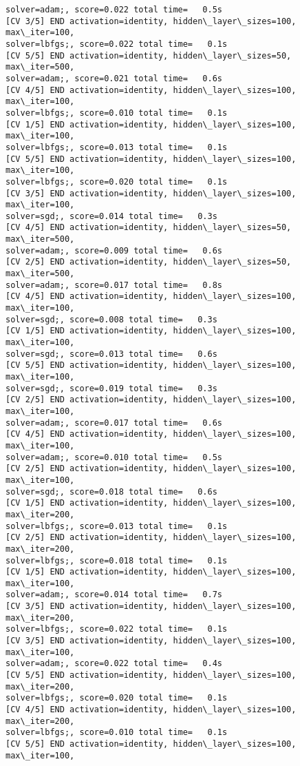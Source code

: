 \documentclass[11pt]{article}
\begin{document}
\begin{Verbatim}[commandchars=\\\{\}]
solver=adam;, score=0.022 total time=   0.5s
[CV 3/5] END activation=identity, hidden\_layer\_sizes=100, max\_iter=100,
solver=lbfgs;, score=0.022 total time=   0.1s
[CV 5/5] END activation=identity, hidden\_layer\_sizes=50, max\_iter=500,
solver=adam;, score=0.021 total time=   0.6s
[CV 4/5] END activation=identity, hidden\_layer\_sizes=100, max\_iter=100,
solver=lbfgs;, score=0.010 total time=   0.1s
[CV 1/5] END activation=identity, hidden\_layer\_sizes=100, max\_iter=100,
solver=lbfgs;, score=0.013 total time=   0.1s
[CV 5/5] END activation=identity, hidden\_layer\_sizes=100, max\_iter=100,
solver=lbfgs;, score=0.020 total time=   0.1s
[CV 3/5] END activation=identity, hidden\_layer\_sizes=100, max\_iter=100,
solver=sgd;, score=0.014 total time=   0.3s
[CV 4/5] END activation=identity, hidden\_layer\_sizes=50, max\_iter=500,
solver=adam;, score=0.009 total time=   0.6s
[CV 2/5] END activation=identity, hidden\_layer\_sizes=50, max\_iter=500,
solver=adam;, score=0.017 total time=   0.8s
[CV 4/5] END activation=identity, hidden\_layer\_sizes=100, max\_iter=100,
solver=sgd;, score=0.008 total time=   0.3s
[CV 1/5] END activation=identity, hidden\_layer\_sizes=100, max\_iter=100,
solver=sgd;, score=0.013 total time=   0.6s
[CV 5/5] END activation=identity, hidden\_layer\_sizes=100, max\_iter=100,
solver=sgd;, score=0.019 total time=   0.3s
[CV 2/5] END activation=identity, hidden\_layer\_sizes=100, max\_iter=100,
solver=adam;, score=0.017 total time=   0.6s
[CV 4/5] END activation=identity, hidden\_layer\_sizes=100, max\_iter=100,
solver=adam;, score=0.010 total time=   0.5s
[CV 2/5] END activation=identity, hidden\_layer\_sizes=100, max\_iter=100,
solver=sgd;, score=0.018 total time=   0.6s
[CV 1/5] END activation=identity, hidden\_layer\_sizes=100, max\_iter=200,
solver=lbfgs;, score=0.013 total time=   0.1s
[CV 2/5] END activation=identity, hidden\_layer\_sizes=100, max\_iter=200,
solver=lbfgs;, score=0.018 total time=   0.1s
[CV 1/5] END activation=identity, hidden\_layer\_sizes=100, max\_iter=100,
solver=adam;, score=0.014 total time=   0.7s
[CV 3/5] END activation=identity, hidden\_layer\_sizes=100, max\_iter=200,
solver=lbfgs;, score=0.022 total time=   0.1s
[CV 3/5] END activation=identity, hidden\_layer\_sizes=100, max\_iter=100,
solver=adam;, score=0.022 total time=   0.4s
[CV 5/5] END activation=identity, hidden\_layer\_sizes=100, max\_iter=200,
solver=lbfgs;, score=0.020 total time=   0.1s
[CV 4/5] END activation=identity, hidden\_layer\_sizes=100, max\_iter=200,
solver=lbfgs;, score=0.010 total time=   0.1s
[CV 5/5] END activation=identity, hidden\_layer\_sizes=100, max\_iter=100,

\end{Verbatim}
\end{document}
